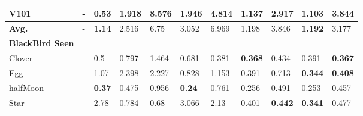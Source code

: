 \begin{table}[h]
{\begin{tabular}{C{2.5cm}|C{.8cm}C{.8cm}|C{.8cm}C{.8cm}C{.8cm}C{.8cm}C{.8cm}C{.8cm}C{.8cm}C{.8cm}}
         V101 & - & \textbf{0.53} &  1.918 &  8.576 &  1.946 &  4.814 &  1.137 &  2.917 &  \textbf{1.103} &  3.844 \\
        \midrule
        \textbf{Avg.} & - & \textbf{1.14} &  2.516 &  6.75 &  3.052 &  6.969 &  1.198 &  3.846 &  \textbf{1.192} & 3.177\\
 
        \midrule
        \midrule
        \raggedright \textbf{BlackBird Seen} &  &  &  &  &\\
        
        \raggedright\hspace{0.3cm} Clover &- &  0.5 &  0.797 &  1.464 &  0.681 &  0.381 &  \textbf{0.368} &  0.434 &  0.391 &  \textbf{0.367} \\
 
        \raggedright\hspace{0.3cm} Egg &- &  1.07 &  2.398 &  2.227 &  0.828 &  1.153 &  0.391 &  0.713 &  \textbf{0.344} &  \textbf{0.408} \\
 

        \raggedright\hspace{0.3cm} halfMoon &-&  \textbf{0.37} &  0.475 &  0.956 &  \textbf{0.24} &  0.761 &  0.256 &  0.491 &  0.253 &  0.457 \\
        
        \raggedright\hspace{0.3cm} Star &- &  2.78 &  0.784 &  0.68 &  3.066 &  2.13 &  0.401 &  \textbf{0.442} &  \textbf{0.341} &  0.477 \\
        

\end{tabular}}
\end{table}
